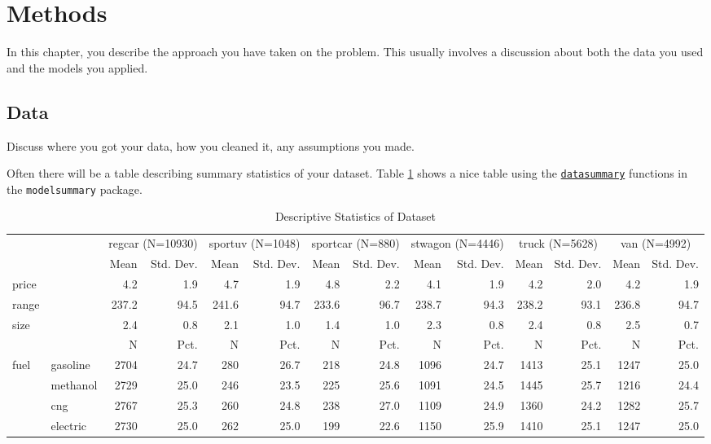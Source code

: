 \documentclass[3p, authoryear]{elsarticle} %
\begin{document}
\hypertarget{methods}{%
\section{Methods}\label{methods}}

In this chapter, you describe the approach you have taken on the problem. This
usually involves a discussion about both the data you used and the models you
applied.

\hypertarget{data}{%
\subsection{Data}\label{data}}

Discuss where you got your data, how you cleaned it, any assumptions you made.

Often there will be a table describing summary statistics of your dataset.
Table \ref{tab:datasummary} shows a nice table using the \href{https://vincentarelbundock.github.io/modelsummary/articles/datasummary.html}{\texttt{datasummary}}
functions in the \texttt{modelsummary} package.

\begin{table}

\caption{\label{tab:datasummary}Descriptive Statistics of Dataset}
\centering
\begin{tabular}[t]{llrrrrrrrrrrrr}
\toprule
\multicolumn{2}{c}{ } & \multicolumn{2}{c}{regcar (N=10930)} & \multicolumn{2}{c}{sportuv (N=1048)} & \multicolumn{2}{c}{sportcar (N=880)} & \multicolumn{2}{c}{stwagon (N=4446)} & \multicolumn{2}{c}{truck (N=5628)} & \multicolumn{2}{c}{van (N=4992)} \\
\cmidrule(l{3pt}r{3pt}){3-4} \cmidrule(l{3pt}r{3pt}){5-6} \cmidrule(l{3pt}r{3pt}){7-8} \cmidrule(l{3pt}r{3pt}){9-10} \cmidrule(l{3pt}r{3pt}){11-12} \cmidrule(l{3pt}r{3pt}){13-14}
  &    & Mean & Std. Dev. & Mean  & Std. Dev.  & Mean   & Std. Dev.   & Mean    & Std. Dev.    & Mean     & Std. Dev.     & Mean      & Std. Dev.     \\
\midrule
price &  & 4.2 & 1.9 & 4.7 & 1.9 & 4.8 & 2.2 & 4.1 & 1.9 & 4.2 & 2.0 & 4.2 & 1.9\\
range &  & 237.2 & 94.5 & 241.6 & 94.7 & 233.6 & 96.7 & 238.7 & 94.3 & 238.2 & 93.1 & 236.8 & 94.7\\
size &  & 2.4 & 0.8 & 2.1 & 1.0 & 1.4 & 1.0 & 2.3 & 0.8 & 2.4 & 0.8 & 2.5 & 0.7\\
\midrule
 &  & N & Pct. & N & Pct. & N & Pct. & N & Pct. & N & Pct. & N & Pct.\\
fuel & gasoline & 2704 & 24.7 & 280 & 26.7 & 218 & 24.8 & 1096 & 24.7 & 1413 & 25.1 & 1247 & 25.0\\
 & methanol & 2729 & 25.0 & 246 & 23.5 & 225 & 25.6 & 1091 & 24.5 & 1445 & 25.7 & 1216 & 24.4\\
 & cng & 2767 & 25.3 & 260 & 24.8 & 238 & 27.0 & 1109 & 24.9 & 1360 & 24.2 & 1282 & 25.7\\
 & electric & 2730 & 25.0 & 262 & 25.0 & 199 & 22.6 & 1150 & 25.9 & 1410 & 25.1 & 1247 & 25.0\\
\bottomrule
\end{tabular}
\end{table}
\end{document}
